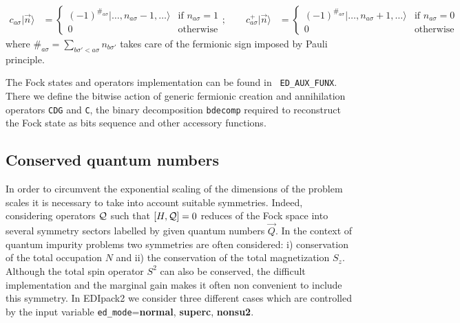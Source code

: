 \documentclass[final,3p,10pt]{elsarticle}
\newcommand{\ket}[1]
{|#1\rangle}
\def\NAME{{\rm EDIpack2 }}
\begin{document}
\begin{align*}
  c_{a\sigma}\ket{\vec{n}} &=
    \begin{cases}
      (-1)^{\#_{a\sigma}}\ket{\dots,n_{a\sigma}\!-\!1,\dots}
      &\text{if $n_{a\sigma}\!=\! 1$}\\
      0 &\text{otherwise}
    \end{cases};\qquad
    c^{+}_{a\sigma}\ket{\vec{n}} &=
     \begin{cases}
      (-1)^{\#_{a\sigma}}\ket{\dots,n_{a\sigma}\!+\!1,\dots}
      & \text{if $n_{a\sigma}\!=\! 0$}\\
      0 & \text{otherwise}
    \end{cases}    
\end{align*}
where $\#_{a\sigma}=\sum_{b\sigma'<a\sigma} n_{b\sigma'}$ takes care
of the fermionic sign imposed by Pauli principle. 

The Fock states and operators implementation can be found in {\tt
  ED\_AUX\_FUNX}. There we define the bitwise action of generic fermionic creation
and annihilation operators {\tt CDG} and {\tt C}, the binary
decomposition {\tt bdecomp} required to reconstruct the Fock state as
bits sequence and other accessory functions. 

\subsection{Conserved quantum numbers}\label{sSecQNs}
In order to circumvent the exponential scaling of the dimensions of
the problem scales it is necessary to take into account suitable symmetries.
Indeed, considering operators ${\cal Q}$ such that $[H, {\cal Q}]=0$
reduces of the Fock space into several symmetry sectors
labelled by given quantum numbers $\vec{Q}$. 
In the context of quantum impurity problems two symmetries are often considered: i)
conservation of the total occupation $N$ and ii) the
conservation of the total magnetization $S_z$. Although the total spin
operator $S^2$ can also be conserved, the difficult  implementation
and the marginal gain makes it often non convenient to include this symmetry.
In \NAME we consider three different cases which are controlled by the
input variable {\tt ed\_mode}={\bf normal}, {\bf superc}, {\bf
  nonsu2}. 
\end{document}
